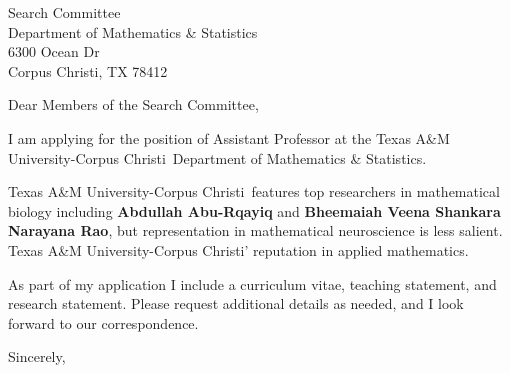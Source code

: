 \documentclass[11pt,a4paper]{letter}
\begin{document}

\def\School{Texas A\&M University-Corpus Christi}

\begin{letter}
{Search Committee\\
Department of Mathematics \& Statistics\\
6300 Ocean Dr\\
Corpus Christi, TX 78412}


\opening{Dear Members of the Search Committee,}

I am applying for the position of Assistant Professor at the \School~Department of Mathematics \& Statistics. 



\School~features top researchers in mathematical biology including \textbf{Abdullah Abu-Rqayiq} and \textbf{Bheemaiah Veena Shankara Narayana Rao}, but representation in mathematical neuroscience is less salient. \School' reputation in applied mathematics.



As part of my application I include a curriculum vitae, teaching statement, and research statement. Please request additional details as needed, and I look forward to our correspondence.

\closing{Sincerely,}
\end{letter}
\end{document}
